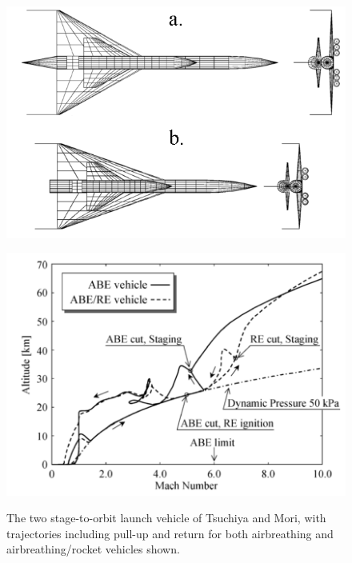 \begin{figure}[ht]
	\centering
	\begin{minipage}[b]{0.45\textwidth}
		\centering
		\includegraphics[width=\linewidth]{"figures/2_literature-review/Tsuchiya Vehicles"}
		
		\label{fig:TsuchiyaVehicle}
	\end{minipage}	
	\begin{minipage}[b]{0.45\textwidth}
		\includegraphics[width=\linewidth]{"figures/2_literature-review/Tsuchiya"}
		
		\label{fig:TsuchiyaTrajectory}
	\end{minipage}
	\caption{The two stage-to-orbit launch vehicle of Tsuchiya and Mori\cite{Tsuchiya2005}, with trajectories including pull-up and return for both airbreathing and airbreathing/rocket vehicles shown.}
	\label{fig:Tsuchiya}
\end{figure}

